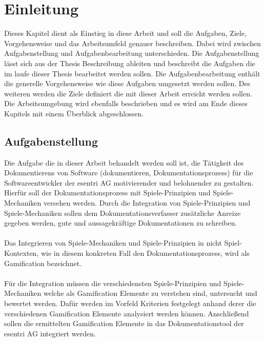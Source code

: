 \documentclass[a4paper,12pt]{scrartcl}
\begin{document}
\section{Einleitung}
Dieses Kapitel dient als Einstieg in diese Arbeit und soll die Aufgaben, Ziele, Vorgehensweise und das Arbeitsumfeld genauer beschreiben. Dabei wird zwischen Aufgabenstellung und Aufgabenbearbeitung unterschieden. Die Aufgabenstellung lässt sich aus der Thesis Beschreibung ableiten und beschreibt die Aufgaben die im laufe dieser Thesis bearbeitet werden sollen. Die Aufgabenbearbeitung enthält die generelle Vorgehensweise wie diese Aufgaben umgesetzt werden sollen. Des weiteren werden die Ziele definiert die mit dieser Arbeit erreicht werden sollen. Die Arbeitsumgebung wird ebenfalls beschrieben und es wird am Ende dieses Kapitels mit einem Überblick abgeschlossen. 
\subsection{Aufgabenstellung}
Die Aufgabe die in dieser Arbeit behandelt werden soll ist, die Tätigkeit des Dokumentierens von Software (dokumentieren, Dokumentationsprozess) für die Softwareentwickler der esentri AG motivierender und belohnender zu gestalten. Hierfür soll der Dokumentationsprozess mit Spiele-Prinzipien und Spiele-Mechaniken versehen werden. Durch die Integration von Spiele-Prinzipien und Spiele-Mechaniken sollen dem Dokumentationsverfasser zusätzliche Anreize gegeben werden, gute und aussagekräftige Dokumentationen zu schreiben. 
\\\\
Das Integrieren von Spiele-Mechaniken und Spiele-Prinzipien in nicht Spiel-Kontexten, wie in diesem konkreten Fall den Dokumentationsprozess, wird als Gamification bezeichnet.
\\\\
Für die Integration müssen die verschiedensten Spiele-Prinzipien und Spiele-Mechaniken welche als Gamification Elemente zu verstehen sind, untersucht und bewertet werden. Dafür werden im Vorfeld Kriterien festgelegt anhand derer die verschiedenen Gamification Elemente analysiert werden können. Anschließend sollen die ermittelten Gamification Elemente in das Dokumentationstool der esentri AG integriert werden. 
\end{document}
